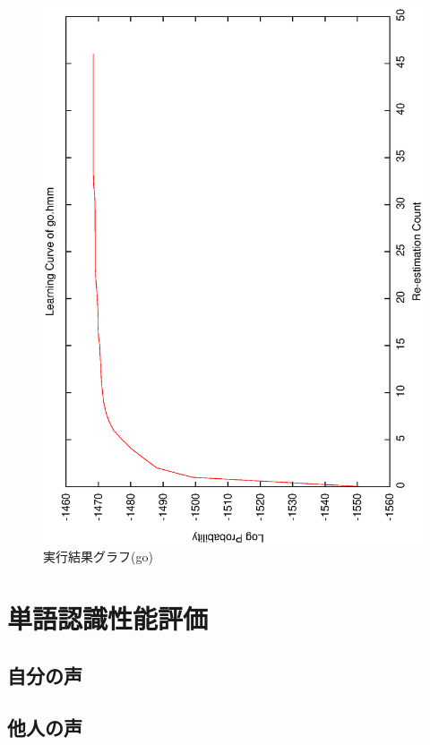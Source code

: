\documentclass[11pt,a4paper, uplatex]{jsarticle}
\begin{document}
\begin{figure}[h]
  \begin{center}
    \includegraphics[width=13.0cm]{learningCurve.ps}
    \caption{実行結果グラフ(go)}
    \label{fig:ps}
  \end{center}
\end{figure}

\section{単語認識性能評価}
\subsection{自分の声}
\subsection{他人の声}
\end{document}
